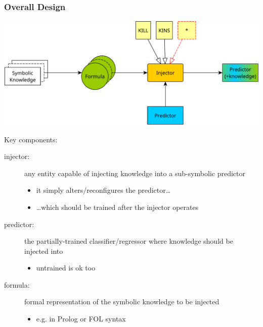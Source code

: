 \documentclass[presentation]{beamer}\mode<presentation>{\usetheme{AMSBolognaFC}}
\begin{document}
\begin{frame}[allowframebreaks]
\frametitle{Overall Design}

    \begin{center}
        \includegraphics[width=\linewidth]{figures/psyki-design.pdf}
    \end{center}

    \framebreak

    Key components:
    \medskip
    \begin{description}
        \item[injector:] any entity capable of injecting knowledge into a sub-symbolic predictor
        \begin{itemize}
            \item it simply alters/reconfigures the predictor\ldots
            \item \ldots which should be trained after the injector operates
        \end{itemize}

        \medskip

        \item[predictor:] the partially-trained classifier/regressor where knowledge should be injected into
        \begin{itemize}
            \item untrained is ok too
        \end{itemize}
        
        \medskip

        \item[formula:] formal representation of the symbolic knowledge to be injected
        \begin{itemize}
            \item e.g. in Prolog or FOL syntax
        \end{itemize}
    \end{description}

    \framebreak


\end{frame}
\end{document}
